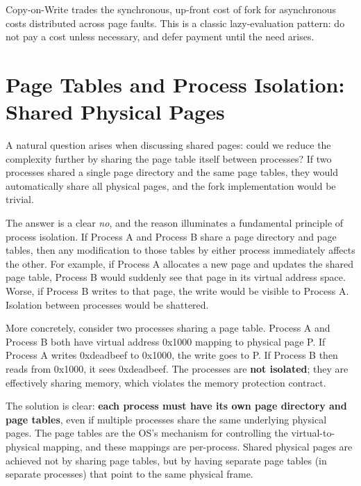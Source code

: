\documentclass[11pt]{article}
\begin{document}
\begin{keyidea}
Copy-on-Write trades the synchronous, up-front cost of fork for asynchronous costs distributed across page faults. This is a classic lazy-evaluation pattern: do not pay a cost unless necessary, and defer payment until the need arises.
\end{keyidea}

\section{Page Tables and Process Isolation: Shared Physical Pages}

A natural question arises when discussing shared pages: could we reduce the complexity further by sharing the page table itself between processes? If two processes shared a single page directory and the same page tables, they would automatically share all physical pages, and the fork implementation would be trivial.

The answer is a clear \emph{no}, and the reason illuminates a fundamental principle of process isolation. If Process A and Process B share a page directory and page tables, then any modification to those tables by either process immediately affects the other. For example, if Process A allocates a new page and updates the shared page table, Process B would suddenly see that page in its virtual address space. Worse, if Process B writes to that page, the write would be visible to Process A. Isolation between processes would be shattered.

More concretely, consider two processes sharing a page table. Process A and Process B both have virtual address 0x1000 mapping to physical page P. If Process A writes 0xdeadbeef to 0x1000, the write goes to P. If Process B then reads from 0x1000, it sees 0xdeadbeef. The processes are \textbf{not isolated}; they are effectively sharing memory, which violates the memory protection contract.

The solution is clear: \textbf{each process must have its own page directory and page tables}, even if multiple processes share the same underlying physical pages. The page tables are the OS's mechanism for controlling the virtual-to-physical mapping, and these mappings are per-process. Shared physical pages are achieved not by sharing page tables, but by having separate page tables (in separate processes) that point to the same physical frame.
\end{document}

